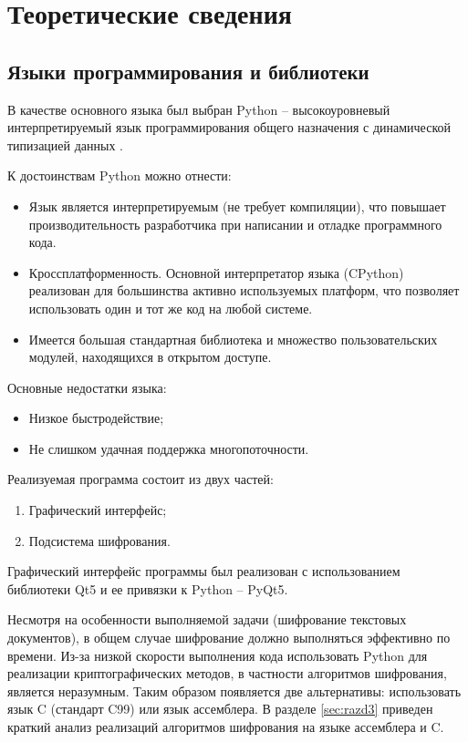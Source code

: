 \newpage
\section{Теоретические сведения}\label{sec:razd2} %

\subsection{Языки программирования и библиотеки}

В качестве основного языка был выбран Python -- высокоуровневый интерпретируемый
язык программирования общего назначения с динамической типизацией
данных \cite{python}.

К достоинствам Python можно отнести:
\begin{itemize}
    \item Язык является интерпретируемым (не требует компиляции), что повышает
    производительность разработчика при написании и отладке программного кода.
    \item Кроссплатформенность. Основной интерпретатор языка (CPython)
    реализован для большинства активно используемых платформ, что позволяет
    использовать один и тот же код на любой системе.
    \item Имеется большая стандартная библиотека и множество пользовательских
    модулей, находящихся в открытом доступе.
\end{itemize}

Основные недостатки языка:
\begin{itemize}
    \item Низкое быстродействие;
    \item Не слишком удачная поддержка многопоточности.
\end{itemize}

Реализуемая программа состоит из двух частей:
\begin{enumerate}
    \item Графический интерфейс;
    \item Подсистема шифрования.
\end{enumerate}

Графический интерфейс программы был реализован с использованием библиотеки Qt5
и ее привязки к Python -- PyQt5.

Несмотря на особенности выполняемой задачи (шифрование текстовых документов),
в общем случае шифрование должно выполняться эффективно по времени.
Из-за низкой скорости выполнения кода использовать Python для реализации криптографических
методов, в частности алгоритмов шифрования, является неразумным.
Таким образом появляется две альтернативы: использовать язык C (стандарт C99) или
язык ассемблера. В разделе \ref{sec:razd3} приведен краткий анализ реализаций
алгоритмов шифрования на языке ассемблера и C.

